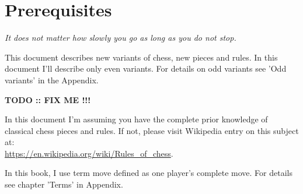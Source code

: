 
\chapter*{Prerequisites}

\begin{flushright}
\parbox{0.7\textwidth}{
\emph{It does not matter how slowly you go as long as you do not stop. \\
 } }
\end{flushright}

\noindent
This document describes new variants of chess, new pieces and rules. In this document I'll describe only
even variants. For details on odd variants see 'Odd variants' in the Appendix.

\textbf{\huge{TODO :: FIX ME !!!}} %

In this document I'm assuming you have the complete prior knowledge of classical chess pieces and rules.
If not, please visit Wikipedia entry on this subject at: \\
\href{https://en.wikipedia.org/wiki/Rules\_of\_chess}{https://en.wikipedia.org/wiki/Rules\_of\_chess}.

In this book, I use term move defined as one player's complete move. For details see chapter 'Terms' in
Appendix.

\clearpage %
